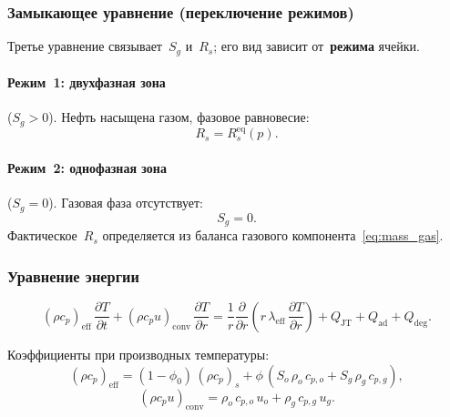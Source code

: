 \documentclass[12pt,a4paper]{article}
\newcommand{\divr}[1]{\frac{1}{r}\frac{\partial}{\partial r}\!\left(r\,#1\right)}
\newcommand{\pdt}[1]{\frac{\partial #1}{\partial t}}
\newcommand{\pdr}[1]{\frac{\partial #1}{\partial r}}
\newcommand{\rhocpeff}{(\rho c_p)_{\mathrm{eff}}}
\newcommand{\rhocpconv}{(\rho c_p u)_{\mathrm{conv}}}
\newcommand{\leff}{\lambda_{\mathrm{eff}}}
\newcommand{\QJT}{Q_{\mathrm{JT}}}
\newcommand{\Qad}{Q_{\mathrm{ad}}}
\newcommand{\Qdeg}{Q_{\mathrm{deg}}}
\begin{document}
\subsubsection{Замыкающее уравнение (переключение режимов)}
\label{sssec:variable_switching}

Третье уравнение связывает~$S_g$ и~$R_s$; его вид зависит
от~\textbf{режима} ячейки.

\paragraph{Режим~1: двухфазная зона} ($S_g > 0$).
Нефть насыщена газом, фазовое равновесие:
\begin{equation}\label{eq:regime1}
  \boxed{R_s = R_s^{\text{eq}}(p).}
\end{equation}

\paragraph{Режим~2: однофазная зона} ($S_g = 0$).
Газовая фаза отсутствует:
\begin{equation}\label{eq:regime2}
  \boxed{S_g = 0.}
\end{equation}
Фактическое~$R_s$ определяется из баланса газового
компонента~\eqref{eq:mass_gas}.


\subsubsection{Уравнение энергии}\label{sssec:energy}

\begin{equation}\label{eq:main_energy_final}
  \boxed{
    \rhocpeff\,\pdt{T}
    + \rhocpconv\,\pdr{T}
    = \divr{\leff\,\pdr{T}}
    + \QJT + \Qad + \Qdeg.
  }
\end{equation}

Коэффициенты при производных температуры:
\begin{equation}\label{eq:main_rhocpeff}
\rhocpeff
    = (1-\phi_0)\,(\rho c_p)_s
      + \phi\,(S_o\,\rho_o\,c_{p,o} + S_g\,\rho_g\,c_{p,g}),
\end{equation}
\begin{equation}\label{eq:main_rhocpconv}
\rhocpconv
    = \rho_o\,c_{p,o}\,u_o + \rho_g\,c_{p,g}\,u_g.
\end{equation}
\end{document}
